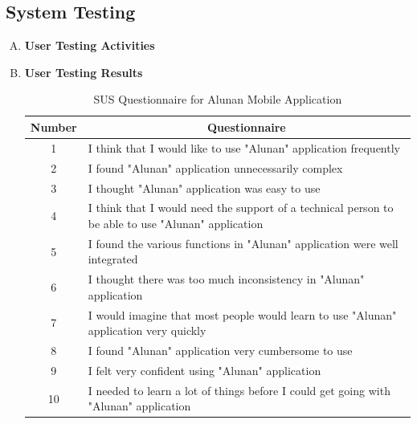 \pagebreak

\subsection{System Testing}
\begin{enumerate}[A.]
    \item \textbf{User Testing Activities} \\
    \item \textbf{User Testing Results} \\
    \begin{table}[htb]
    \caption{SUS Questionnaire for Alunan Mobile Application}
    \label{tab:mytable}
    \centering
    \begin{tabular}{|p{3cm}|p{12cm}|}
    \hline
    \multicolumn{1}{|c|}{\textbf{Number}} & 
    \multicolumn{1}{c|}{\textbf{Questionnaire}} \\
    \hline 
    \multicolumn{1}{|c|}{1} & I think that I would like to use "Alunan" application frequently \\ \hline
    \multicolumn{1}{|c|}{2} & I found "Alunan" application unnecessarily complex \\ \hline
    \multicolumn{1}{|c|}{3} & I thought "Alunan" application was easy to use \\ \hline
    \multicolumn{1}{|c|}{4} & I think that I would need the support of a technical person to be able to use "Alunan" application \\ \hline
    \multicolumn{1}{|c|}{5} & I found the various functions in "Alunan" application were well integrated \\ \hline
    \multicolumn{1}{|c|}{6} & I thought there was too much inconsistency in "Alunan" application \\ \hline
    \multicolumn{1}{|c|}{7} & I would imagine that most people would learn to use "Alunan" application very quickly \\ \hline
    \multicolumn{1}{|c|}{8} & I found "Alunan" application very cumbersome to use \\ \hline
    \multicolumn{1}{|c|}{9} & I felt very confident using "Alunan" application \\ \hline
    \multicolumn{1}{|c|}{10} & I needed to learn a lot of things before I could get going with "Alunan" application \\ \hline
    \end{tabular}
    \end{table}
    

\end{enumerate}
